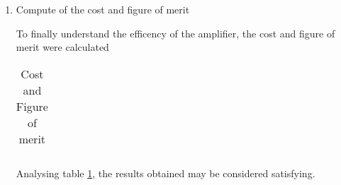 \begin{enumerate}
\item Compute of the cost and figure of merit
\par To finally understand the efficency of the amplifier, the cost and figure of merit were calculated

\begin{table}[ht]
  \centering
  \begin{tabular}{|l|r|}
    \hline    
   \end{tabular}
  \caption{Cost and Figure of merit}
  \label{tab:cost}
\end{table}

Analysing table \ref{tab:cost}, the results obtained may be considered satisfying.


\end{enumerate}


